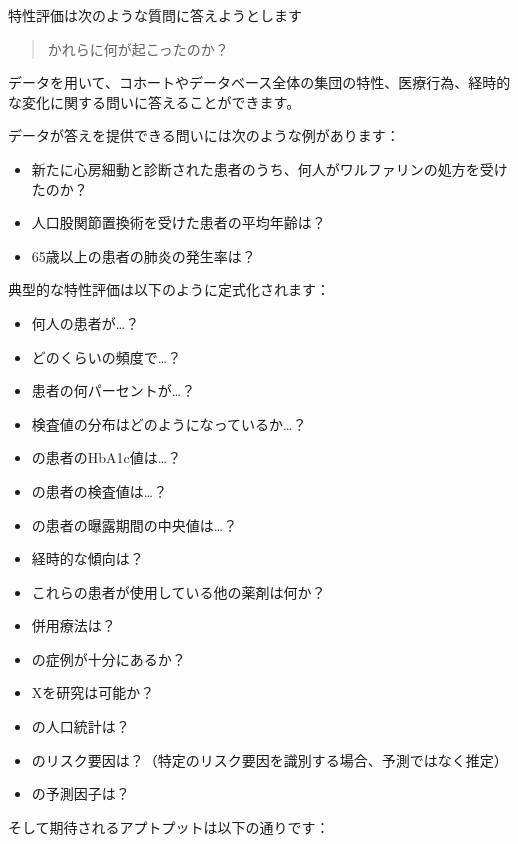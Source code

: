 \documentclass[
  11pt]{book}
\providecommand{\tightlist}{%
  \setlength{\itemsep}{0pt}\setlength{\parskip}{0pt}}
\theoremstyle{definition}
\theoremstyle{definition}
\theoremstyle{definition}
\theoremstyle{definition}
\theoremstyle{remark}
\begin{document}
特性評価は次のような質問に答えようとします

\begin{quote}
かれらに何が起こったのか？
\end{quote}

データを用いて、コホートやデータベース全体の集団の特性、医療行為、経時的な変化に関する問いに答えることができます。

データが答えを提供できる問いには次のような例があります：

\begin{itemize}
\tightlist
\item
  新たに心房細動と診断された患者のうち、何人がワルファリンの処方を受けたのか？
\item
  人口股関節置換術を受けた患者の平均年齢は？
\item
  65歳以上の患者の肺炎の発生率は？
\end{itemize}

典型的な特性評価は以下のように定式化されます：

\begin{itemize}
\tightlist
\item
  何人の患者が\ldots？
\item
  どのくらいの頻度で\ldots？
\item
  患者の何パーセントが\ldots？
\item
  検査値の分布はどのようになっているか\ldots？
\item
  の患者のHbA1c値は\ldots？
\item
  の患者の検査値は\ldots？
\item
  の患者の曝露期間の中央値は\ldots？
\item
  経時的な傾向は？
\item
  これらの患者が使用している他の薬剤は何か？
\item
  併用療法は？
\item
  の症例が十分にあるか？
\item
  Xを研究は可能か？
\item
  の人口統計は？
\item
  のリスク要因は？（特定のリスク要因を識別する場合、予測ではなく推定）
\item
  の予測因子は？
\end{itemize}

そして期待されるアプトプットは以下の通りです：
\end{document}
